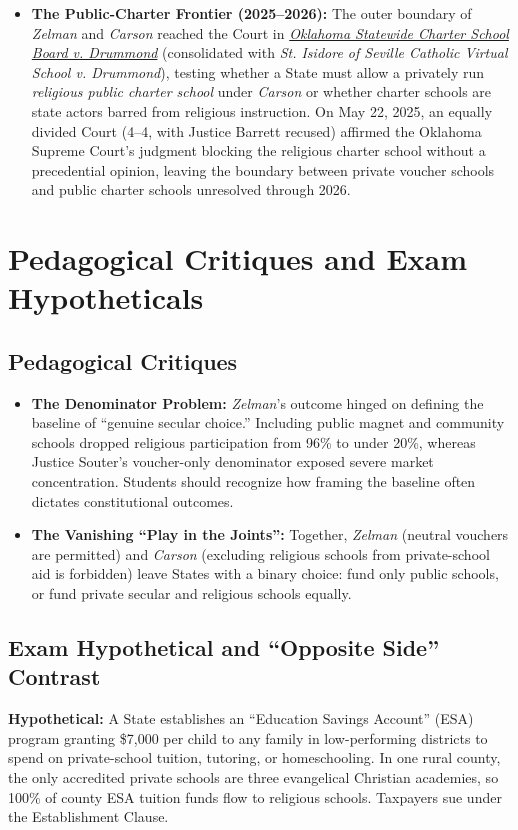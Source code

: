 \documentclass[12pt]{article}
\begin{document}
\begin{itemize}
  \item \textbf{The Public-Charter Frontier (2025--2026):} The outer boundary of \emph{Zelman} and \emph{Carson} reached the Court in \href{https://www.scotusblog.com/cases/oklahoma-statewide-charter-school-board-v-drummond/}{\emph{Oklahoma Statewide Charter School Board v. Drummond}} (consolidated with \emph{St. Isidore of Seville Catholic Virtual School v. Drummond}), testing whether a State must allow a privately run \emph{religious public charter school} under \emph{Carson} or whether charter schools are state actors barred from religious instruction. On May 22, 2025, an equally divided Court (4--4, with Justice Barrett recused) affirmed the Oklahoma Supreme Court's judgment blocking the religious charter school without a precedential opinion, leaving the boundary between private voucher schools and public charter schools unresolved through 2026.
\end{itemize}

\section{Pedagogical Critiques and Exam Hypotheticals}

\subsection{Pedagogical Critiques}
\begin{itemize}
  \item \textbf{The Denominator Problem:} \emph{Zelman}'s outcome hinged on defining the baseline of ``genuine secular choice.'' Including public magnet and community schools dropped religious participation from 96\% to under 20\%, whereas Justice Souter's voucher-only denominator exposed severe market concentration. Students should recognize how framing the baseline often dictates constitutional outcomes.
  \item \textbf{The Vanishing ``Play in the Joints'':} Together, \emph{Zelman} (neutral vouchers are permitted) and \emph{Carson} (excluding religious schools from private-school aid is forbidden) leave States with a binary choice: fund only public schools, or fund private secular and religious schools equally.
\end{itemize}

\subsection{Exam Hypothetical and ``Opposite Side'' Contrast}
\textbf{Hypothetical:} A State establishes an ``Education Savings Account'' (ESA) program granting \$7,000 per child to any family in low-performing districts to spend on private-school tuition, tutoring, or homeschooling. In one rural county, the only accredited private schools are three evangelical Christian academies, so 100\% of county ESA tuition funds flow to religious schools. Taxpayers sue under the Establishment Clause.
\end{document}
